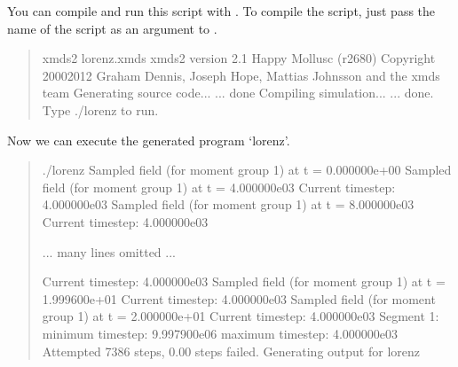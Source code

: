 \documentclass[letterpaper,10pt,english]{sphinxmanual}
\begin{document}
\sphinxAtStartPar
You can compile and run this script with . To compile the script, just pass the name of the script as an argument to .
\begin{quote}

\begin{sphinxVerbatim}[commandchars=\\\{\}]
\PYGZdl{} xmds2 lorenz.xmds
xmds2 version 2.1 \PYGZdq{}Happy Mollusc\PYGZdq{} (r2680)
Copyright 2000\PYGZhy{}2012 Graham Dennis, Joseph Hope, Mattias Johnsson
                    and the xmds team
Generating source code...
... done
Compiling simulation...
... done. Type \PYGZsq{}./lorenz\PYGZsq{} to run.
\end{sphinxVerbatim}
\end{quote}

\sphinxAtStartPar
Now we can execute the generated program ‘lorenz’.
\begin{quote}

\begin{sphinxVerbatim}[commandchars=\\\{\}]
\PYGZdl{} ./lorenz
Sampled field (for moment group \PYGZsh{}1) at t = 0.000000e+00
Sampled field (for moment group \PYGZsh{}1) at t = 4.000000e\PYGZhy{}03
Current timestep: 4.000000e\PYGZhy{}03
Sampled field (for moment group \PYGZsh{}1) at t = 8.000000e\PYGZhy{}03
Current timestep: 4.000000e\PYGZhy{}03

... many lines omitted ...

Current timestep: 4.000000e\PYGZhy{}03
Sampled field (for moment group \PYGZsh{}1) at t = 1.999600e+01
Current timestep: 4.000000e\PYGZhy{}03
Sampled field (for moment group \PYGZsh{}1) at t = 2.000000e+01
Current timestep: 4.000000e\PYGZhy{}03
Segment 1: minimum timestep: 9.997900e\PYGZhy{}06 maximum timestep: 4.000000e\PYGZhy{}03
  Attempted 7386 steps, 0.00\PYGZpc{} steps failed.
Generating output for lorenz
\end{sphinxVerbatim}
\end{quote}
\end{document}
